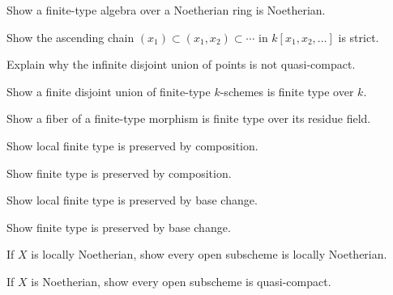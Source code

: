 \begin{exercise}\label{exr:vi26-12}Show a finite-type algebra over a Noetherian ring is Noetherian.\end{exercise}

\begin{exercise}\label{exr:vi26-13}Show the ascending chain $(x_1)\subset(x_1,x_2)\subset\cdots$ in $k[x_1,x_2,\dots]$ is strict.\end{exercise}

\begin{exercise}\label{exr:vi26-14}Explain why the infinite disjoint union of points is not quasi-compact.\end{exercise}

\begin{exercise}\label{exr:vi26-15}Show a finite disjoint union of finite-type $k$-schemes is finite type over $k$.\end{exercise}

\begin{exercise}\label{exr:vi26-16}Show a fiber of a finite-type morphism is finite type over its residue field.\end{exercise}

\begin{exercise}\label{exr:vi26-17}Show local finite type is preserved by composition.\end{exercise}

\begin{exercise}\label{exr:vi26-18}Show finite type is preserved by composition.\end{exercise}

\begin{exercise}\label{exr:vi26-19}Show local finite type is preserved by base change.\end{exercise}

\begin{exercise}\label{exr:vi26-20}Show finite type is preserved by base change.\end{exercise}

\begin{exercise}\label{exr:vi26-21}If $X$ is locally Noetherian, show every open subscheme is locally Noetherian.\end{exercise}

\begin{exercise}\label{exr:vi26-22}If $X$ is Noetherian, show every open subscheme is quasi-compact.\end{exercise}

